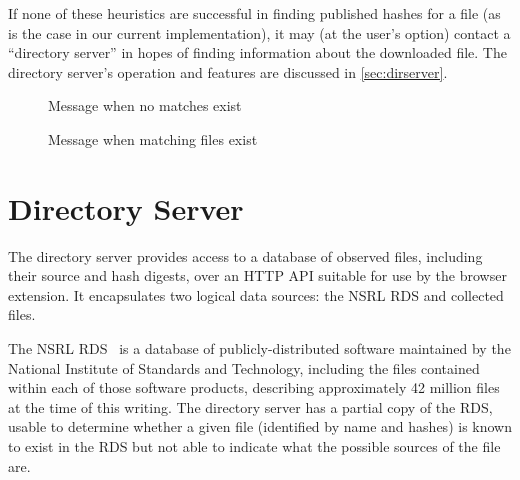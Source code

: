 \documentclass[letterpaper,twocolumn,10pt]{article}
\begin{document}
If none of these heuristics are successful in finding published hashes for a file (as is
the case in our current implementation), it may (at the user's option) contact
a ``directory server'' in hopes of finding information about the downloaded file.
The directory server's operation and features are discussed in \autoref{sec:dirserver}.

\begin{figure}
    \caption{Message when no matches exist}
    \label{fig:ss-none}
\end{figure}

\begin{figure}
    \caption{Message when matching files exist}
    \label{fig:ss-match}
\end{figure}

\section{Directory Server}
\label{sec:dirserver}

The directory server provides access to a database of observed files, including their
source and hash digests, over an HTTP API suitable for use by the browser extension.
It encapsulates two logical data sources: the NSRL RDS and collected files.

The NSRL RDS~\cite{nsrl-rds} is a database of publicly-distributed software maintained by the
National Institute of Standards and Technology, including the files contained within each
of those software products, describing approximately 42 million files at the time of this
writing. The directory server has a partial copy of the RDS, usable to determine
whether a given file (identified by name and hashes) is known to exist in the RDS
but not able to indicate what the possible sources of the file are.
\end{document}
